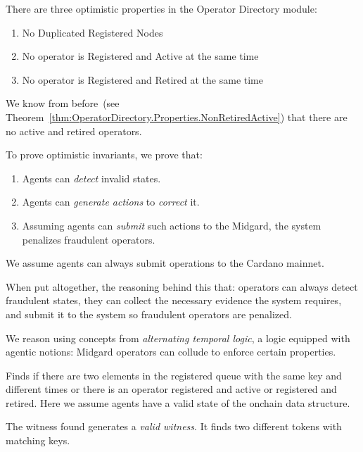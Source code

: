 There are three optimistic properties in the Operator Directory module:
%
\begin{enumerate}
  \item No Duplicated Registered Nodes
  \item No operator is Registered and Active at the same time
  \item No operator is Registered and Retired at the same time
  \end{enumerate}

We know from before~(see
Theorem~\ref{thm:OperatorDirectory.Properties.NonRetiredActive}) that there are
no active and retired operators.

To prove optimistic invariants, we prove that:
%
\begin{enumerate}
    \item Agents can \emph{detect} invalid states.
    \item Agents can \emph{generate actions} to \emph{correct} it.
    \item Assuming agents can \emph{submit} such actions to the Midgard, the
system penalizes fraudulent operators.
  \end{enumerate}
We assume agents can always submit operations to the Cardano mainnet.

When put altogether, the reasoning behind this that: operators can always detect
fraudulent states, they can collect the necessary evidence the system requires,
and submit it to the system so fraudulent operators are penalized.
%

We reason using concepts from \emph{alternating temporal logic}, a logic
equipped with agentic notions: Midgard operators can collude to enforce certain
properties.


\begin{definition}
  \label{dfn:OpsDir.OptimisticDetection.find_witness}
  \leanok
  Finds if there are two elements in the registered queue with the same key and
different times or there is an operator registered and active or registered and
retired.
%
  Here we assume agents have a valid state of the onchain data structure.
  \end{definition}

\begin{theorem}
  \label{thm:OpsDir.OptimisticDetection.find_witness_valid}
  \leanok
  The witness found generates a \emph{valid witness}.
  It finds two different tokens with matching keys.
  \end{theorem}


